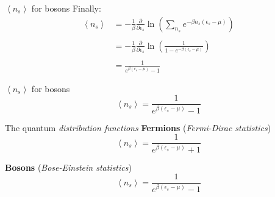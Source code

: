 \documentclass{beamer}
\begin{document}
	
\begin{frame}{$\left<n_s\right>$ for bosons}
	Finally:
	\begin{align*}
		\left<n_s\right>&=-\frac{1}{\beta}\frac{\partial}{\partial \epsilon_s}\ln{\left(\sum_{n_s}e^{-\beta n_s\left(\epsilon_s-\mu\right)}\right)}\\\\
		&=-\frac{1}{\beta}\frac{\partial}{\partial \epsilon_s}\ln{\left(\frac{1}{1-e^{-\beta\left(\epsilon_s-\mu\right)}}\right)}\\\\
		&=\frac{1}{e^{\beta\left(\epsilon_s-\mu\right)}-1}
	\end{align*}
\end{frame}



\begin{frame}{$\left<n_s\right>$ for bosons}
	\begin{equation*}
		\boxed{	\left<n_s\right>=\frac{1}{e^{\beta\left(\epsilon_s-\mu\right)}-1}}
	\end{equation*}
\end{frame}



\begin{frame}{The quantum \textit{distribution functions}}
	\textbf{Fermions} (\textit{Fermi-Dirac statistics})
	\begin{equation*}
		\left<n_s\right>=\frac{1}{e^{\beta\left(\epsilon_s-\mu\right)}+1}
	\end{equation*}


	\textbf{Bosons} (\textit{Bose-Einstein statistics})
\begin{equation*}
	\left<n_s\right>=\frac{1}{e^{\beta\left(\epsilon_s-\mu\right)}-1}
\end{equation*}
\end{frame}
\end{document}

